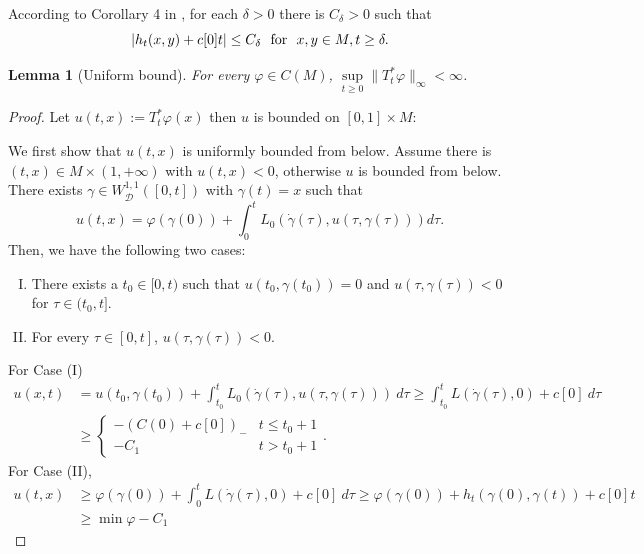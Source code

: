 \documentclass[12pt]{amsart}
\theoremstyle{plain}
\newtheorem{lemma}{Lemma}
\theoremstyle{definition}
\newcommand{\cD}{\mathcal D}
\newcommand{\cW}{W^{1,1}}
\newcommand{\cWD}{\cW_\cD}
\newcommand{\fui}{\varphi}
\newcommand{\ga}{\gamma}
\newcommand{\de}{\delta}
\newcommand{\dga}{\dot\gamma}
\begin{document}
According to Corollary 4 in \cite{SM},
for each $\de>0$ there is $C_\de >0$ such that
\[|h_t(x,y)+c[0]t|\le C_\de\ \hbox{ for }\ x,y\in  M, t\ge\de.\]
\begin{lemma}[Uniform bound]\label{unif-bound}
For every $\fui\in C(M)$, 
$\sup\limits_{t\ge 0}\|T^*_t \fui\|_\infty<\infty$.
\end{lemma}
\begin{proof}
 Let $u(t,x):=T^*_t\fui(x)$ then $u$ is bounded on $[0,1]\times M$:

We first show that $u(t,x)$ is uniformly bounded from below.
Assume  there is $(t,x)\in M\times(1,+\infty)$ with $u(t,x) < 0$,
otherwise $u$ is bounded from below.
There exists $\ga\in\cWD([0,t])$ with $\ga(t)=x$ such that
\begin{equation}\label{minimizer}
u(t,x)=\fui(\ga(0))+\int_0^tL_0(\dga(\tau),u(\tau,\ga(\tau)))d\tau.
\end{equation}
Then, we have the following two cases:
\begin{enumerate}[(I)]
\item There exists a $t_0\in [0,t)$ such that
  $u(t_0,\ga(t_0)) = 0$ and $u(\tau,\ga(\tau))< 0$ for $\tau\in (t_0,t]$.
\item For every $\tau\in[0,t]$,  $u(\tau,\ga(\tau)) < 0$.
\end{enumerate}
For Case (I)
\begin{align*}
u(x, t)&=u(t_0,\ga(t_0)) + \int_{t_0}^t L_0( \dga(\tau), u(\tau,\ga(\tau)))\ d\tau
 \ge\int_{t_0}^t L(\dga(\tau),0)+c[0]\ d\tau\\
&\ge \begin{cases}-(C(0)+c[0])_- & t\le t_0+1\\-C_1 & t>t_0+1 \end{cases}.
  \end{align*}
For Case (II), 
 \begin{align*}
u(t,x)&\ge\fui(\ga(0))+\int_0^tL(\dga(\tau), 0)+c[0]\ d\tau
\ge\fui(\ga(0))+h_t(\ga(0),\ga(t))+c[0]t\\&\ge\min\fui-C_1
 \end{align*}  


\end{proof}
\end{document}

